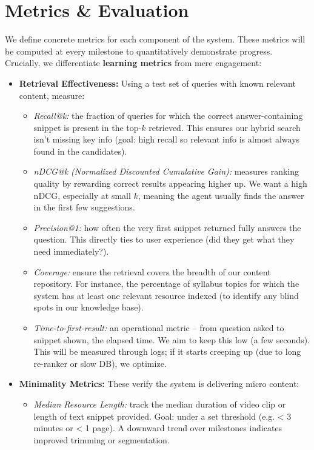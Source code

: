 \documentclass[11pt]{article}
\begin{document}
\section{Metrics \& Evaluation}
We define concrete metrics for each component of the system. These metrics will be computed at every milestone to quantitatively demonstrate progress. Crucially, we differentiate \textbf{learning metrics} from mere engagement:
\begin{itemize}
  \item \textbf{Retrieval Effectiveness:} Using a test set of queries with known relevant content, measure:
    \begin{itemize}
      \item \textit{Recall@k:} the fraction of queries for which the correct answer-containing snippet is present in the top-$k$ retrieved. This ensures our hybrid search isn’t missing key info (goal: high recall so relevant info is almost always found in the candidates).
      \item \textit{nDCG@k (Normalized Discounted Cumulative Gain):} measures ranking quality by rewarding correct results appearing higher up. We want a high nDCG, especially at small $k$, meaning the agent usually finds the answer in the first few suggestions.
      \item \textit{Precision@1:} how often the very first snippet returned fully answers the question. This directly ties to user experience (did they get what they need immediately?).
      \item \textit{Coverage:} ensure the retrieval covers the breadth of our content repository. For instance, the percentage of syllabus topics for which the system has at least one relevant resource indexed (to identify any blind spots in our knowledge base).
      \item \textit{Time-to-first-result:} an operational metric – from question asked to snippet shown, the elapsed time. We aim to keep this low (a few seconds). This will be measured through logs; if it starts creeping up (due to long re-ranker or slow DB), we optimize.
    \end{itemize}
  \item \textbf{Minimality Metrics:} These verify the system is delivering micro content:
    \begin{itemize}
      \item \textit{Median Resource Length:} track the median duration of video clip or length of text snippet provided. Goal: under a set threshold (e.g. < 3 minutes or < 1 page). A downward trend over milestones indicates improved trimming or segmentation.

\end{itemize}
\end{itemize}
\end{document}
